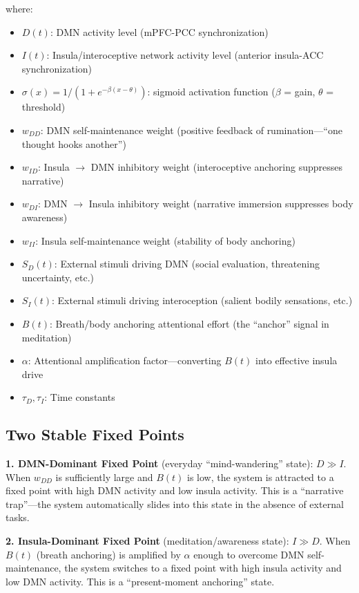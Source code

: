 \documentclass[11pt,a4paper]{article}
\begin{document}
where:
\begin{itemize}[nosep]
    \item $D(t)$: DMN activity level (mPFC-PCC synchronization)
    \item $I(t)$: Insula/interoceptive network activity level (anterior insula-ACC synchronization)
    \item $\sigma(x) = 1/(1 + e^{-\beta(x - \theta)})$: sigmoid activation function ($\beta$ = gain, $\theta$ = threshold)
    \item $w_{DD}$: DMN self-maintenance weight (positive feedback of rumination---``one thought hooks another'')
    \item $w_{ID}$: Insula $\rightarrow$ DMN inhibitory weight (interoceptive anchoring suppresses narrative)
    \item $w_{DI}$: DMN $\rightarrow$ Insula inhibitory weight (narrative immersion suppresses body awareness)
    \item $w_{II}$: Insula self-maintenance weight (stability of body anchoring)
    \item $S_D(t)$: External stimuli driving DMN (social evaluation, threatening uncertainty, etc.)
    \item $S_I(t)$: External stimuli driving interoception (salient bodily sensations, etc.)
    \item $B(t)$: Breath/body anchoring attentional effort (the ``anchor'' signal in meditation)
    \item $\alpha$: Attentional amplification factor---converting $B(t)$ into effective insula drive
    \item $\tau_D, \tau_I$: Time constants
\end{itemize}

\subsection{Two Stable Fixed Points}

\textbf{1. DMN-Dominant Fixed Point} (everyday ``mind-wandering'' state): $D \gg I$. When $w_{DD}$ is sufficiently large and $B(t)$ is low, the system is attracted to a fixed point with high DMN activity and low insula activity. This is a ``narrative trap''---the system automatically slides into this state in the absence of external tasks.

\textbf{2. Insula-Dominant Fixed Point} (meditation/awareness state): $I \gg D$. When $B(t)$ (breath anchoring) is amplified by $\alpha$ enough to overcome DMN self-maintenance, the system switches to a fixed point with high insula activity and low DMN activity. This is a ``present-moment anchoring'' state.
\end{document}
